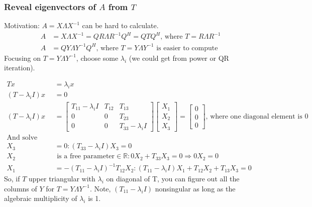 \documentclass{article}
\begin{document}
\subsubsection{Reveal eigenvectors of $A$ from $T$}
Motivation: $A = X\Lambda X^{-1}$ can be hard to calculate.
\begin{align*}
    A &= X\Lambda X^{-1} = QR \Lambda R^{-1}Q^H = QTQ^H \textrm{, where } T = R\Lambda R^{-1}\\
    A &= QY\Lambda Y^{-1}Q^H \textrm{, where $T = Y \Lambda Y^{-1}$ is easier to compute}
\end{align*}
Focusing on $T = Y \Lambda Y^{-1}$, choose some $\lambda_i$ (we could get from power or QR iteration). 

\begin{align*}
    Tx &= \lambda_i x\\
    (T - \lambda_i I)x &= 0\\
    (T - \lambda_i I)x  &= \begin{bmatrix} T_{11} - \lambda_i I & T_{12} & T_{13}\\ 0 & 0 & T_{23}\\
            0 & 0 & T_{33} - \lambda_i I \end{bmatrix} \begin{bmatrix} X_1 \\ X_2 \\ X_3 \end{bmatrix} = \begin{bmatrix} 0 \\ 0 \\ 0 \end{bmatrix} \textrm{, where one diagonal element is 0}\\
    \textrm{And solve with back substitution:}&\\
            X_3 &= 0: (T_{33} - \lambda_i I) X_3 = 0\\
            X_2 &\textrm{ is a free parameter} \in \mathbb{R}: 0X_2 + T_{33}X_3 = 0 \Longrightarrow 0X_2 = 0\\
            X_1 &= -(T_{11}-\lambda_i I)^{-1}T_{12}X_2: (T_{11}-\lambda_i I)X_1 + T_{12}X_2 + T_{13}X_3 = 0
\end{align*}
So, if $T$ upper triangular with $\lambda_i$ on diagonal of T, you can figure out all the columns of $Y$ for $T = Y\Lambda Y^{-1}$. Note, $(T_{11} - \lambda_i I)$ nonsingular as long as the algebraic multiplicity of $\lambda_i$ is 1.
\end{document}
